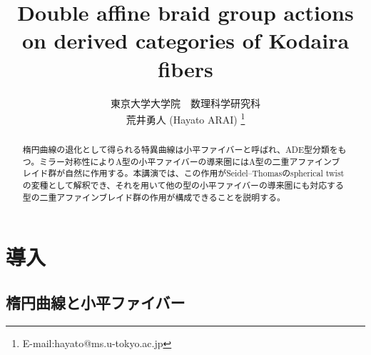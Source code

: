 \documentclass[uplatex,11pt,a4paper,dvipdfmx]{jsarticle}
\title{Double affine braid group actions on derived categories of Kodaira fibers}    %
\author{東京大学大学院　数理科学研究科 \\
荒井勇人 (Hayato ARAI) 
\footnote{E-mail:hayato@ms.u-tokyo.ac.jp}}
\date{}    %
\numberwithin{equation}{section}
\theoremstyle{definition}
\begin{document}
\maketitle

\begin{abstract}   %
    楕円曲線の退化として得られる特異曲線は小平ファイバーと呼ばれ、ADE型分類をもつ。ミラー対称性によりA型の小平ファイバーの導来圏にはA型の二重アファインブレイド群が自然に作用する。本講演では、この作用がSeidel--Thomasのspherical twistの変種として解釈でき、それを用いて他の型の小平ファイバーの導来圏にも対応する型の二重アファインブレイド群の作用が構成できることを説明する。
\end{abstract}


\section{導入}
\subsection{楕円曲線と小平ファイバー}




\end{document}
